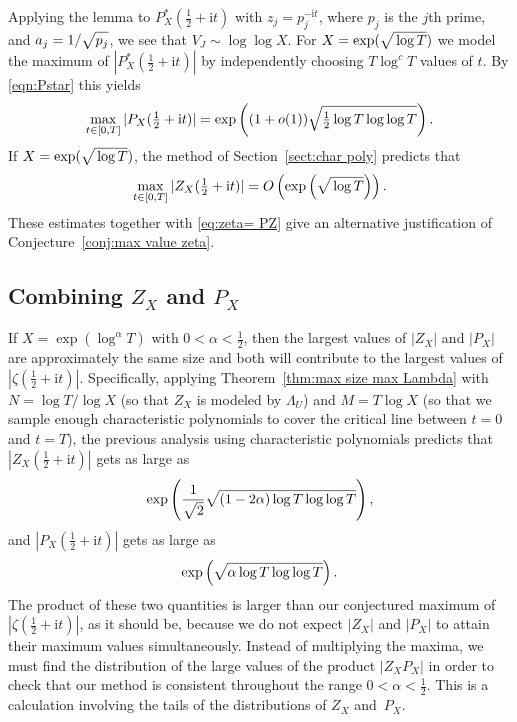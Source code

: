 \documentclass[10pt,reqno,twoside]{amsart}
\renewcommand{\i}{{\mathrm{i}}} %
\numberwithin{equation}{section}
\numberwithin{theorem}{section}
\begin{document}
{{Applying the lemma to $P^*_X(\tfrac12+\i t)$ with $z_j=p_j^{-\i
t}$, where $p_j$ is the  $j$th prime, and $a_j=1/\sqrt{\mathstrut
\mathstrut p_j}$, we see that $V_J\sim \log\log X$. For
$X=\exp(\sqrt{\mathstrut \log T})$ we model the maximum of
$|P^*_X(\tfrac12+\i t)|$ by independently choosing $T \log^c T$
values of $t$. By \eqref{eqn:Pstar} this yields
\begin{equation}\label{eq: max P}
\max_{t\in [0,T]} |P_X(\tfrac12+\i t)| = \exp\left(
(1+o(1))\sqrt{\mathstrut \tfrac12 \log T\log \log T}\right) .
\end{equation}
If
$X=\exp(\sqrt{\mathstrut \log T})$, the method of
Section~\ref{sect:char poly} predicts that
\begin{equation}\label{eq: max Z}
\max_{t\in [0,T]} |Z_X(\tfrac12+\i t)| =
O\left(
    \exp\left(\sqrt{\mathstrut \log T}\right)
  \right) .
\end{equation}
These estimates together with \eqref{eq:zeta= PZ} give an
alternative justification of Conjecture~\ref{conj:max value zeta}.



\subsection{Combining $Z_X$ and $P_X$}\label{sect:primes and zeros}

If $X=\exp(\log^\alpha T)$ with $0<\alpha<\tfrac12$, then the
largest values of $|Z_X|$ and $|P_X|$ are  approximately the same
size and both will contribute to the largest values of
$|\zeta(\tfrac12+\i t)|$.  Specifically, applying
Theorem~\ref{thm:max size max Lambda} with $N=\log T / \log X$ (so that
$Z_X$ is modeled by $\Lambda_U$) and $M=T\log X$ (so that we sample
enough characteristic polynomials to cover the critical line
between $t=0$ and $t=T$), the previous analysis using characteristic
polynomials predicts that $|Z_X(\tfrac12+\i t)|$ gets as large as
\begin{equation}
\exp\left(\frac{1}{\sqrt{\mathstrut 2}} \sqrt{\mathstrut (1-2\alpha)\log T\log\log
T}\right),
\end{equation}
and $|P_X(\tfrac12+\i t)|$ gets as large as
\begin{equation}
\exp\left(\sqrt{\mathstrut \alpha\log T\log\log T}\right).
\end{equation}
The product of these two quantities is larger than our conjectured
maximum of $|\zeta(\tfrac12 + \i t)|$, as it should be, because we do
not expect $|Z_X|$ and $|P_X|$ to attain their maximum values
simultaneously. Instead of multiplying the maxima, we must find the distribution
of the large values of the product $|Z_XP_X|$ in order to check
that our method is consistent throughout the range
$0<\alpha<\tfrac12$.   This is a calculation involving
the  tails of the  distributions of $Z_X$ and~$P_X$.

}}
\end{document}
